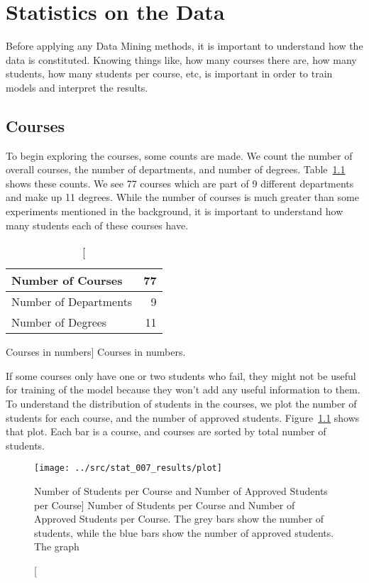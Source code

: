 \chapter{Statistics on the Data}
\label{sec:stats}

Before applying any Data Mining methods, it is important to understand how the
data is constituted. Knowing things like, how many courses there are, how many
students, how many students per course, etc, is important in order to train
models and interpret the results.

\section{Courses}

To begin exploring the courses, some counts are made. We count the number of
overall courses, the number of departments, and number of degrees.
Table~\ref{tab:courses_stats} shows these counts. We see 77 courses which are
part of 9 different departments and make up 11 degrees. While the number of
courses is much greater than some experiments mentioned in the background, it
is important to understand how many students each of these courses have.

\begin{table}[h!]
    \centering

    \begin{tabular}{| l | r |}
        \hline
        Number of Courses     & 77 \\ \hline
        Number of Departments & 9  \\ \hline
        Number of Degrees     & 11 \\ \hline
    \end{tabular}

    \caption
        [Courses in numbers]
        {Courses in numbers.}

    \label{tab:courses_stats}
\end{table}

If some courses only have one or two students who fail, they might not be
useful for training of the model because they won't add any useful information
to them. To understand the distribution of students in the courses, we plot the
number of students for each course, and the number of approved students.
Figure~\ref{fig:stat_007} shows that plot. Each bar is a course, and courses
are sorted by total number of students.

\begin{figure}[h!]
    \centering

    \texttt{[image: ../src/stat\_007\_results/plot]}

    \caption
        [Number of Students per Course and Number of Approved Students per
        Course]
        {Number of Students per Course and Number of Approved Students per
        Course. The grey bars show the number of students, while the blue bars
        show the number of approved students. The graph}

    \label{fig:stat_007}
\end{figure}

